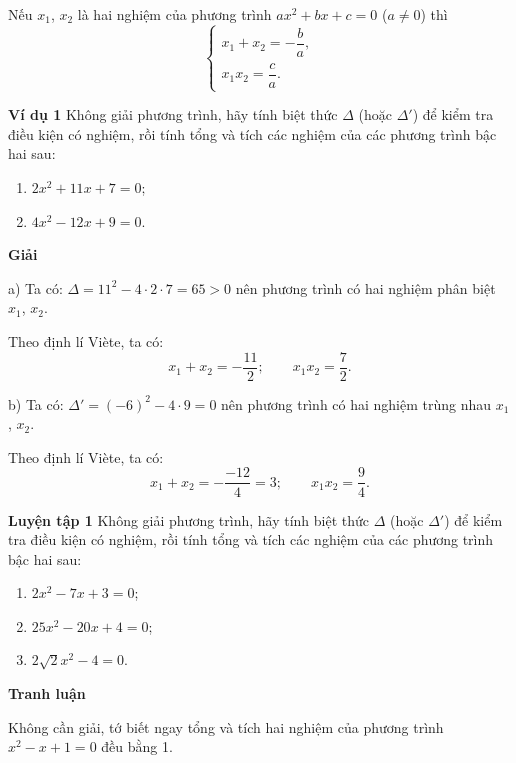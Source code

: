 \begin{lesson}
    \begin{keyconcept}
        Nếu $x_1$, $x_2$ là hai nghiệm của phương trình $ax^2+bx+c=0$ ($a\ne0$) thì
        \[
            \begin{cases}
                x_1+x_2=-\dfrac{b}{a},\\[4pt]
                x_1x_2=\dfrac{c}{a}.
            \end{cases}
        \]
    \end{keyconcept}

    \textbf{Ví dụ 1} Không giải phương trình, hãy tính biệt thức $\Delta$ (hoặc $\Delta'$) để kiểm tra điều kiện có nghiệm, rồi tính tổng và tích các nghiệm của các phương trình bậc hai sau:
    \begin{enumerate}[label=\alph*)]
        \item $2x^2+11x+7=0$;
        \item $4x^2-12x+9=0$.
    \end{enumerate}

    \textbf{Giải}

    a) Ta có: $\Delta=11^2-4\cdot2\cdot7=65>0$ nên phương trình có hai nghiệm phân biệt $x_1$, $x_2$.

    Theo định lí Viète, ta có:
    \[
        x_1+x_2=-\dfrac{11}{2};\qquad x_1x_2=\dfrac{7}{2}.
    \]

    b) Ta có: $\Delta'=(-6)^2-4\cdot9=0$ nên phương trình có hai nghiệm trùng nhau $x_1$, $x_2$.

    Theo định lí Viète, ta có:
    \[
        x_1+x_2=-\dfrac{-12}{4}=3;\qquad x_1x_2=\dfrac{9}{4}.
    \]

    \textbf{Luyện tập 1} Không giải phương trình, hãy tính biệt thức $\Delta$ (hoặc $\Delta'$) để kiểm tra điều kiện có nghiệm, rồi tính tổng và tích các nghiệm của các phương trình bậc hai sau:
    \begin{enumerate}[label=\alph*)]
        \item $2x^2-7x+3=0$;
        \item $25x^2-20x+4=0$;
        \item $2\sqrt{2}x^2-4=0$.
    \end{enumerate}

    \answerline
    \answerline
    \answerline

    \textbf{Tranh luận}

    Không cần giải, tớ biết ngay tổng và tích hai nghiệm của phương trình $x^2-x+1=0$ đều bằng 1.



\end{lesson}
